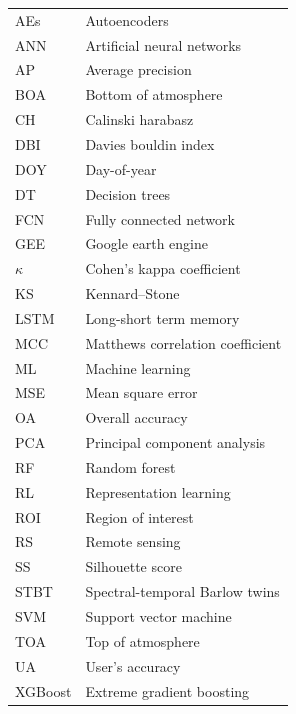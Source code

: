 \documentclass[journal,article,submit,pdftex,moreauthors]{Definitions/mdpi}
\providecommand{\DIFaddend}{} %
\begin{document}
{\noindent 
\begin{tabular}{@{}ll}
AEs & Autoencoders\\
ANN & Artificial neural networks\\
AP & Average precision\\
BOA & Bottom of atmosphere\\
CH & Calinski harabasz\\
DBI & Davies bouldin index\\
DOY & Day-of-year\\
DT & Decision trees\\
FCN & Fully connected network\\
GEE & Google earth engine\\
$\kappa$ & Cohen’s kappa coefficient\\
KS & Kennard–Stone\\
LSTM &  Long-short term memory\\
MCC & Matthews correlation coefficient\\
ML & Machine learning\\
MSE & Mean square error\\
OA & Overall accuracy\\
PCA & Principal component analysis\\
RF & Random forest\\
RL & Representation learning\\
ROI & Region of interest\\
RS & Remote sensing\\
SS & Silhouette score\\
STBT & Spectral-temporal Barlow twins\\
SVM & Support vector machine\\
TOA & Top of atmosphere\\
UA & User's accuracy\\
XGBoost & Extreme gradient boosting \\
\end{tabular}
}
\DIFaddend 
\end{document}
